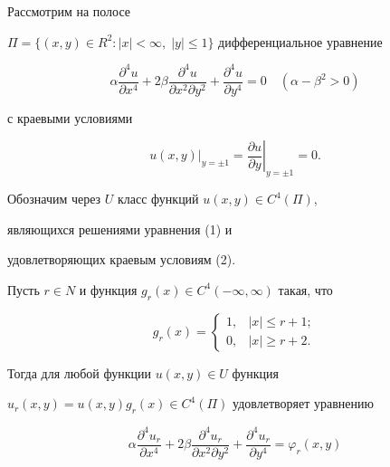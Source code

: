 Рассмотрим на полосе 


$\Pi=\{(x,y)\in R^2:|x|<\infty,\;|y|\le1\}$ дифференциальное уравнение 


\begin{equation} 


\alpha\frac{\partial^4u}{\partial x^4} 


+2\beta\frac{\partial^4u}{\partial x^2\partial y^2}+ 


\frac{\partial^4u}{\partial y^4}=0 \quad (\alpha-\beta^2>0) 


\end{equation} 


с краевыми условиями 


\begin{equation} 


\left. u(x,y)\right|_{y=\pm 1}= 


\left. \frac{\partial u}{\partial y}\right|_{y=\pm 1}=0. 


\end{equation} 


Обозначим через $U$ класс функций $u(x,y)\in C^4(\Pi)$, 


являющихся решениями уравнения (1) и 


удовлетворяющих краевым условиям (2). 


 


Пусть $r\in N$ и функция $g_r(x)\in C^4(-\infty,\infty)$ такая, что 


$$ 


g_r(x)=


\begin{cases} 


1, &|x|\le r+1;\\ 


0, &|x|\ge r+2. 


\end{cases} 


$$ 


Тогда для любой функции $u(x,y)\in U$ функция 


$u_r(x,y)=u(x,y)g_r(x)\in C^4(\Pi)$ удовлетворяет уравнению 


\begin{equation} 


\alpha\frac{\partial^4u_r}{\partial x^4} 


+2\beta\frac{\partial^4u_r}{\partial x^2\partial y^2}+ 


\frac{\partial^4u_r}{\partial y^4}= \varphi_r(x,y) 


\end{equation} 


